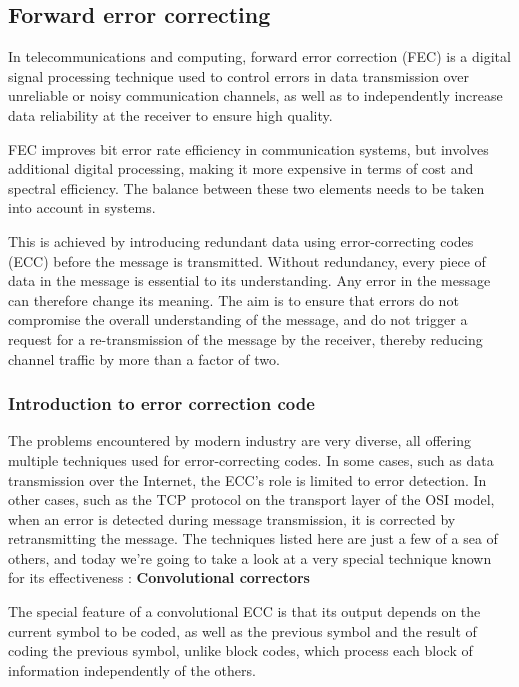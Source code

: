 \subsection{Forward error correcting}

In telecommunications and computing, forward error correction (FEC) is a digital signal processing technique used to control errors in data transmission over unreliable or noisy communication channels, as well as to independently increase data reliability at the receiver to ensure high quality.

FEC improves bit error rate efficiency in communication systems, but involves additional digital processing, making it more expensive in terms of cost and spectral efficiency. The balance between these two elements needs to be taken into account in systems.

This is achieved by introducing redundant data using error-correcting codes (ECC) before the message is transmitted.  Without redundancy, every piece of data in the message is essential to its understanding. Any error in the message can therefore change its meaning.  The aim is to ensure that errors do not compromise the overall understanding of the message, and do not trigger a request for a re-transmission of the message by the receiver, thereby reducing channel traffic by more than a factor of two.

\subsubsection{Introduction to error correction code}

The problems encountered by modern industry are very diverse, all offering multiple techniques used for error-correcting codes. In some cases, such as data transmission over the Internet, the ECC's role is limited to error detection. In other cases, such as the TCP protocol on the transport layer of the OSI model, when an error is detected during message transmission, it is corrected by retransmitting the message. The techniques listed here are just a few of a sea of others, and today we're going to take a look at a very special technique known for its effectiveness : \textbf{Convolutional correctors}

The special feature of a convolutional ECC is that its output depends on the current symbol to be coded, as well as the previous symbol and the result of coding the previous symbol, unlike block codes, which process each block of information independently of the others.

